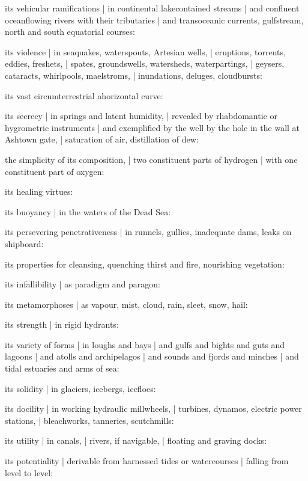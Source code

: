 \Memories
its vehicular ramifications |
in continental lakecontained streams |
and confluent oceanflowing rivers with their tributaries |
and transoceanic currents, gulfstream, north and south equatorial courses:

\Science
its violence |
in seaquakes, waterspouts, Artesian wells, |
eruptions, torrents, eddies, freshets, |
spates, groundswells, watersheds, waterpartings, |
geysers, cataracts, whirlpools, maelstroms, |
inundations, deluges, cloudbursts:

\Places
its vast circumterrestrial ahorizontal curve:

\Household
its secrecy |
in springs and latent humidity, |
revealed by rhabdomantic or hygrometric instruments |
and exemplified by the well
by the hole in the wall at Ashtown gate, |
saturation of air,
distillation of dew:

\Philosophy
the simplicity of its composition, |
two constituent parts of hydrogen |
with one constituent part of oxygen:

\Religious
its healing virtues:

\Memories
its buoyancy |
in the waters of the Dead Sea:

\Factual
its persevering penetrativeness |
in runnels, gullies, inadequate dams, leaks on shipboard:

\Poetry
its properties for cleansing, quenching thirst and fire, nourishing vegetation:

\Science
its infallibility |
as paradigm and paragon:

\Places
its metamorphoses |
as vapour, mist, cloud, rain, sleet, snow, hail:

\Household
its strength |
in rigid hydrants:

\Religious
its variety of forms |
in loughs and bays |
and gulfs and bights and guts and lagoons |
and atolls and archipelagos |
and sounds and fjords and minches |
and tidal estuaries and arms of sea:

\Science
its solidity |
in glaciers, icebergs, icefloes:

\Memories
its docility |
in working hydraulic millwheels, |
turbines, dynamos, electric power stations, |
bleachworks, tanneries, scutchmills:

\Poetry
its utility |
in canals, |
rivers, if navigable, |
floating and graving docks:

\Places
its potentiality |
derivable from harnessed tides or watercourses |
falling from level to level:

